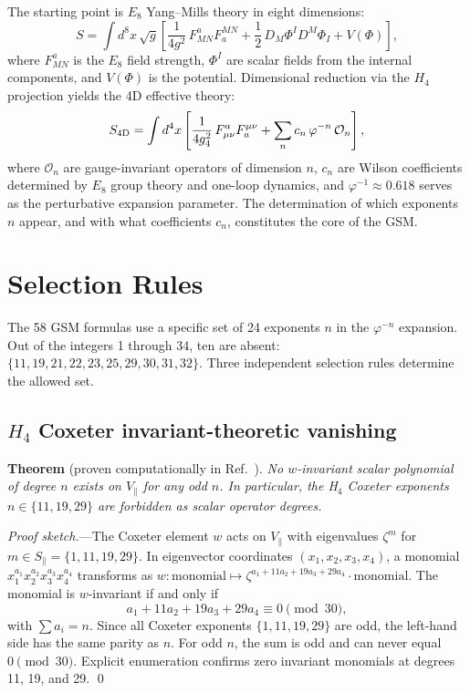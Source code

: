 \documentclass[aps,prd,twocolumn,superscriptaddress,nofootinbib,showpacs]{revtex4-2}
\begin{document}
The starting point is $E_8$ Yang--Mills theory in eight dimensions:
\begin{equation}
S = \int d^8x\, \sqrt{g}\left[ \frac{1}{4g^2}\,F_{MN}^a F^{MN}_a
+ \frac{1}{2}\,D_M \Phi^I D^M \Phi_I + V(\Phi) \right],
\label{eq:8daction}
\end{equation}
where $F_{MN}^a$ is the $E_8$ field strength, $\Phi^I$ are scalar
fields from the internal components, and $V(\Phi)$ is the potential.
Dimensional reduction via the $H_4$ projection yields the 4D effective
theory:
\begin{equation}
S_{\rm 4D} = \int d^4x\left[ \frac{1}{4g_4^2}\,F_{\mu\nu}^a
F^{\mu\nu}_a + \sum_n c_n\, \varphi^{-n}\, \mathcal{O}_n \right],
\label{eq:4daction}
\end{equation}
where $\mathcal{O}_n$ are gauge-invariant operators of dimension $n$,
$c_n$ are Wilson coefficients determined by $E_8$ group theory and
one-loop dynamics, and $\varphi^{-1} \approx 0.618$ serves as the
perturbative expansion parameter.  The determination of which
exponents $n$ appear, and with what coefficients $c_n$, constitutes the
core of the GSM.

\section{Selection Rules}\label{sec:selection}

The 58 GSM formulas use a specific set of 24 exponents $n$ in the
$\varphi^{-n}$ expansion.  Out of the integers 1 through 34, ten are
absent: $\{11, 19, 21, 22, 23, 25, 29, 30, 31, 32\}$.  Three
independent selection rules determine the allowed set.

\subsection{$H_4$ Coxeter invariant-theoretic vanishing}
\label{sec:rule1}

\textbf{Theorem} (proven computationally in Ref.~\cite{GSMrepo}).
\emph{No $w$-invariant scalar polynomial of degree $n$ exists on
$V_\parallel$ for any odd $n$.  In particular, the H$_4$ Coxeter
exponents $n \in \{11, 19, 29\}$ are forbidden as scalar operator
degrees.}

\emph{Proof sketch.}---The Coxeter element $w$ acts on $V_\parallel$
with eigenvalues $\zeta^m$ for $m \in S_\parallel = \{1,11,19,29\}$.
In eigenvector coordinates $(x_1, x_2, x_3, x_4)$, a monomial
$x_1^{a_1} x_2^{a_2} x_3^{a_3} x_4^{a_4}$ transforms as
$w: \text{monomial} \mapsto \zeta^{a_1 + 11a_2 + 19a_3 + 29a_4}
\cdot \text{monomial}$.
The monomial is $w$-invariant if and only if
\begin{equation}
a_1 + 11a_2 + 19a_3 + 29a_4 \equiv 0 \pmod{30},
\label{eq:invariance}
\end{equation}
with $\sum a_i = n$.  Since all Coxeter exponents $\{1,11,19,29\}$
are odd, the left-hand side has the same parity as $n$.  For odd $n$,
the sum is odd and can never equal $0 \pmod{30}$.  Explicit
enumeration confirms zero invariant monomials at degrees 11, 19, and
29.  \qed
\end{document}
